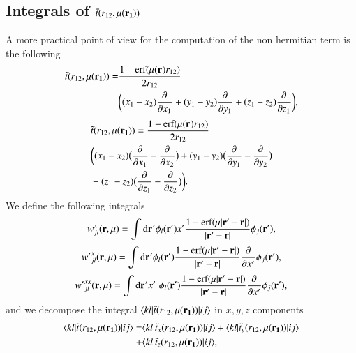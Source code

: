 \documentclass[aip,jcp,reprint,noshowkeys,superscriptaddress]{revtex4-1}
\newcommand{\matelem}[3]{\langle #1 | #2 | #3 \rangle}
\newcommand{\deriv}[3]{\frac{\partial^{#3} #1}{\partial {#2}^{#3}}}
\newcommand{\br}[0]{{\bf {r}}}
\newcommand{\dr}[1]{\text{d}{\bf r_{#1}}}
\newcommand{\mur}[1]{\mu({\bf r_{#1}})}
\begin{document}
\subsection{Integrals of $\tilde{t}(r_{12},\mur{1})$}
A more practical point of view for the computation of the non hermitian term is the following 
\begin{equation}
 \begin{aligned}
 \tilde{t}(r_{12},\mur{1}) =& \frac{1 - \text{erf}(\mur{} r_{12})}{2 r_{12}} \\ 
                           &\bigg( (x_1 - x_2) \deriv{}{x_1}{} + (y_1 - y_2) \deriv{}{y_1}{} + (z_1 - z_2) \deriv{}{z_1}{}\bigg),
 \end{aligned}
\end{equation}
\begin{equation}
 \begin{aligned}
 \label{def_non_hermit}
& \tilde{t}(r_{12},\mur{1})  = \frac{1 - \text{erf}(\mur{} r_{12})}{2 r_{12}} \\
& \bigg( (x_1 - x_2) \big( \deriv{}{x_1}{} - \deriv{}{x_2}{} \big) +
         (y_1 - y_2) \big( \deriv{}{y_1}{} - \deriv{}{y_2}{} \big)  \\
&  +      (z_1 - z_2) \big( \deriv{}{z_1}{} - \deriv{}{z_2}{} \big)\bigg).                                                
 \end{aligned}
\end{equation}
We define the following integrals
\begin{equation}
 {w}_{jl}^{x}(\br,\mu) = \int \dr{}' \phi_l(\br') x' \frac{1 - \text{erf}(\mu |\br' - \br| )}{|\br' - \br|} \phi_j(\br'),
\end{equation}
\begin{equation}
 {w'}_{jl}^{x}(\br,\mu) = \int \dr{}' \phi_l(\br') \frac{1 - \text{erf}(\mu |\br' - \br| )}{|\br' - \br|}\deriv{}{x'}{} \phi_j(\br'),
\end{equation}
\begin{equation}
 {w'}_{jl}^{xx}(\br,\mu) = \int \dr{}' x' \, \,\phi_l(\br') \frac{1 - \text{erf}(\mu |\br' - \br| )}{|\br' - \br|}\deriv{}{x'}{} \phi_j(\br'),
\end{equation}
and we decompose the integral $\matelem{kl}{\tilde{t}(r_{12},\mur{1})}{ij}$ in $x,y,z$ components 
\begin{equation}
 \begin{aligned}
  \matelem{kl}{\tilde{t}(r_{12},\mur{1})}{ij} =& \matelem{kl}{\tilde{t}_x(r_{12},\mur{1})}{ij} 
                                              + \matelem{kl}{\tilde{t}_y(r_{12},\mur{1})}{ij} \\
                                              +& \matelem{kl}{\tilde{t}_z(r_{12},\mur{1})}{ij},
 \end{aligned}
\end{equation}
\end{document}
